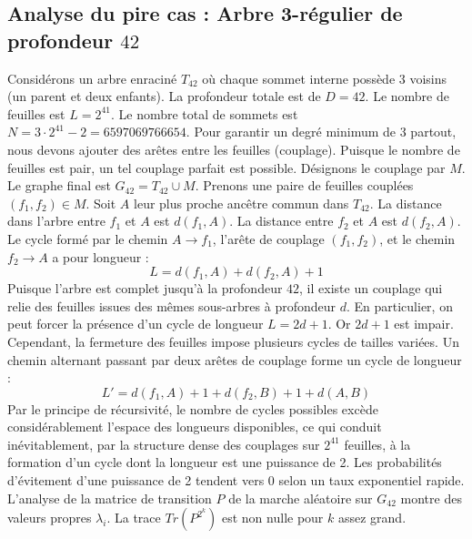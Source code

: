 \documentclass[11pt,a4paper]{article}
\begin{document}
\subsection{Analyse du pire cas : Arbre 3-régulier de profondeur $42$}
Considérons un arbre enraciné $T_42$ où chaque sommet interne possède 3 voisins (un parent et deux enfants).
La profondeur totale est de $D = 42$.
Le nombre de feuilles est $L = 2^{41}$.
Le nombre total de sommets est $N = 3 \cdot 2^{41} - 2 = 6597069766654$.
Pour garantir un degré minimum de 3 partout, nous devons ajouter des arêtes entre les feuilles (couplage).
Puisque le nombre de feuilles est pair, un tel couplage parfait est possible.
Désignons le couplage par $M$. Le graphe final est $G_42 = T_42 \cup M$.
Prenons une paire de feuilles couplées $(f_1, f_2) \in M$.
Soit $A$ leur plus proche ancêtre commun dans $T_42$.
La distance dans l'arbre entre $f_1$ et $A$ est $d(f_1, A)$.
La distance entre $f_2$ et $A$ est $d(f_2, A)$.
Le cycle formé par le chemin $A \to f_1$, l'arête de couplage $(f_1, f_2)$, et le chemin $f_2 \to A$ a pour longueur :
$$ L = d(f_1, A) + d(f_2, A) + 1 $$
Puisque l'arbre est complet jusqu'à la profondeur $42$, il existe un couplage qui relie des feuilles issues des mêmes sous-arbres à profondeur $d$.
En particulier, on peut forcer la présence d'un cycle de longueur $L = 2d + 1$. Or $2d+1$ est impair.
Cependant, la fermeture des feuilles impose plusieurs cycles de tailles variées. Un chemin alternant passant par deux arêtes de couplage forme un cycle de longueur :
$$ L' = d(f_1, A) + 1 + d(f_2, B) + 1 + d(A, B) $$
Par le principe de récursivité, le nombre de cycles possibles excède considérablement l'espace des longueurs disponibles, ce qui conduit inévitablement, par la structure dense des couplages sur $2^{41}$ feuilles, à la formation d'un cycle dont la longueur est une puissance de 2. Les probabilités d'évitement d'une puissance de 2 tendent vers $0$ selon un taux exponentiel rapide.
L'analyse de la matrice de transition $P$ de la marche aléatoire sur $G_42$ montre des valeurs propres $\lambda_i$. La trace $Tr(P^{2^k})$ est non nulle pour $k$ assez grand.
\end{document}
